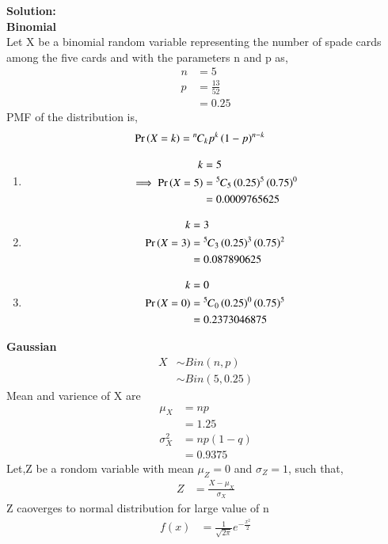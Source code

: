 \documentclass[journal,11pt,onecolumn]{IEEEtran}
\providecommand{\pr}[1]{\ensuremath{\Pr\left(#1\right)}}
\providecommand{\brak}[1]{\ensuremath{\left(#1\right)}}
\newcommand{\solution}{\noindent \textbf{Solution: }}
\providecommand{\pr}[1]{\ensuremath{\Pr\left(#1\right)}}
\newcommand*{\permcomb}[4][0mu]{{{}^{#3}\mkern#1#2_{#4}}}
\newcommand*{\comb}[1][-1mu]{\permcomb[#1]{C}}
\begin{document}
\solution\\
\textbf{Binomial}\\
Let X be a binomial random variable representing the number of spade cards among the five cards and with the parameters n and p as,
\begin{align}
	n&=5\\
	p&=\frac{13}{52}\\
	&=0.25
\end{align}
PMF of the distribution is,
\begin{align}
	\pr{X=k}&=\comb{n}{k}p^k\brak{1-p}^{n-k}
\end{align}
\begin{enumerate}
	\item
	\begin{align}
	k&=5\\
	\implies \pr{X=5}&=\comb{5}{5}\brak{0.25}^5\brak{0.75}^0\\
	&=0.0009765625
\end{align}
	\item
	\begin{align}
	k&=3\\
	\pr{X=3}&=\comb{5}{3}\brak{0.25}^3\brak{0.75}^2\\
	&=0.087890625
\end{align}
	\item
	\begin{align}
	k&=0\\
	\pr{X=0}&=\comb{5}{0}\brak{0.25}^0\brak{0.75}^5\\
	&=0.2373046875
\end{align}
\end{enumerate}
\textbf{Gaussian}\\
\begin{align}
	X &\sim Bin\brak{n,p}\\
	&\sim Bin\brak{5,0.25}
\end{align}
Mean and varience of X are
\begin{align}
	\mu_X&=np\\
	&=1.25\\
	\sigma^2_X&=np\brak{1-q}\\
	&=0.9375
\end{align}
Let,Z be a rondom variable with mean $\mu_Z = 0$ and $\sigma_Z=1$, such that,
\begin{align}
	Z&=\frac{X- \mu_X}{\sigma_X}
\end{align}
Z caoverges to normal distribution for large value of n
\begin{align}
	f\brak{x}&=\frac{1}{\sqrt{2\pi}}e^{-\frac{x^2}{2}}
\end{align}
\end{document}
